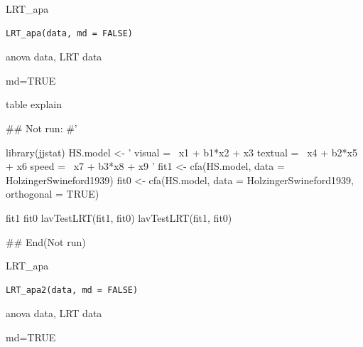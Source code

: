 \documentclass[a4paper]{book}
\begin{document}
%
\begin{Description}
LRT\_apa
\end{Description}
%
\begin{Usage}
\begin{verbatim}
LRT_apa(data, md = FALSE)
\end{verbatim}
\end{Usage}
%
\begin{Arguments}
\begin{ldescription}
\item[\code{data}] anova data, LRT data

\item[\code{md}] md=TRUE
\end{ldescription}
\end{Arguments}
%
\begin{Value}
table explain
\end{Value}
%
\begin{Examples}
\begin{ExampleCode}

## Not run: 
#'

library(jjstat)
HS.model <- '
    visual  =~ x1 + b1*x2 + x3
    textual =~ x4 + b2*x5 + x6
    speed   =~ x7 + b3*x8 + x9
'
fit1 <- cfa(HS.model, data = HolzingerSwineford1939)
fit0 <- cfa(HS.model, data = HolzingerSwineford1939,
            orthogonal = TRUE)

fit1 %
fit0 %
lavTestLRT(fit1, fit0)
lavTestLRT(fit1, fit0) %

## End(Not run)


\end{ExampleCode}
\end{Examples}
%
\begin{Description}
LRT\_apa
\end{Description}
%
\begin{Usage}
\begin{verbatim}
LRT_apa2(data, md = FALSE)
\end{verbatim}
\end{Usage}
%
\begin{Arguments}
\begin{ldescription}
\item[\code{data}] anova data, LRT data

\item[\code{md}] md=TRUE
\end{ldescription}
\end{Arguments}
\end{document}
